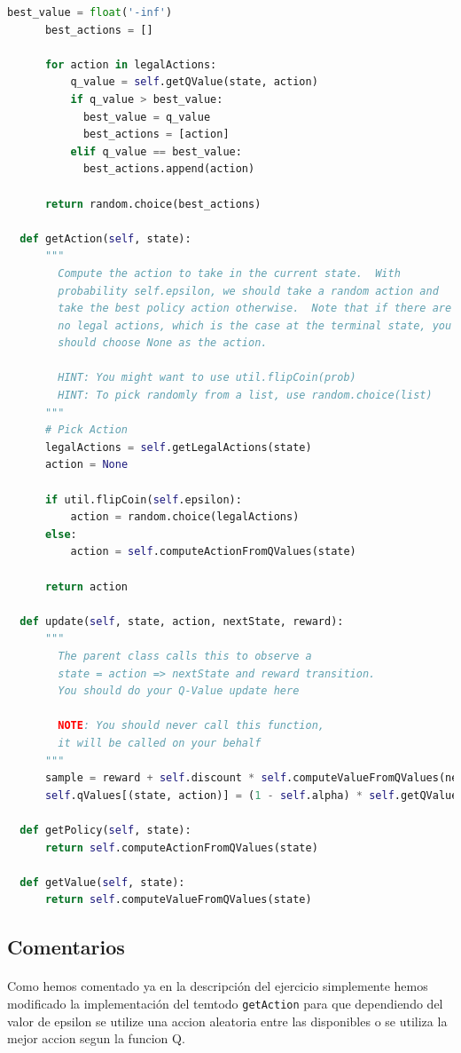 \documentclass{report}
\begin{document}
\begin{lstlisting}[language=Python, caption=Epsilon Greedy]
      best_value = float('-inf')
      best_actions = []
      
      for action in legalActions:
          q_value = self.getQValue(state, action)
          if q_value > best_value:
            best_value = q_value
            best_actions = [action]
          elif q_value == best_value:
            best_actions.append(action)
      
      return random.choice(best_actions)

  def getAction(self, state):
      """
        Compute the action to take in the current state.  With
        probability self.epsilon, we should take a random action and
        take the best policy action otherwise.  Note that if there are
        no legal actions, which is the case at the terminal state, you
        should choose None as the action.

        HINT: You might want to use util.flipCoin(prob)
        HINT: To pick randomly from a list, use random.choice(list)
      """
      # Pick Action
      legalActions = self.getLegalActions(state)
      action = None
      
      if util.flipCoin(self.epsilon):
          action = random.choice(legalActions)
      else:
          action = self.computeActionFromQValues(state)

      return action

  def update(self, state, action, nextState, reward):
      """
        The parent class calls this to observe a
        state = action => nextState and reward transition.
        You should do your Q-Value update here

        NOTE: You should never call this function,
        it will be called on your behalf
      """
      sample = reward + self.discount * self.computeValueFromQValues(nextState)
      self.qValues[(state, action)] = (1 - self.alpha) * self.getQValue(state, action) + self.alpha * sample

  def getPolicy(self, state):
      return self.computeActionFromQValues(state)

  def getValue(self, state):
      return self.computeValueFromQValues(state)

\end{lstlisting}
      \subsection*{Comentarios}
        \paragraph*{}{
          Como hemos comentado ya en la descripción del ejercicio simplemente hemos modificado la implementación del temtodo \texttt{getAction} para que dependiendo del valor de epsilon se utilize una accion aleatoria entre las disponibles o se utiliza la mejor accion segun la funcion Q.
        }
\end{document}
